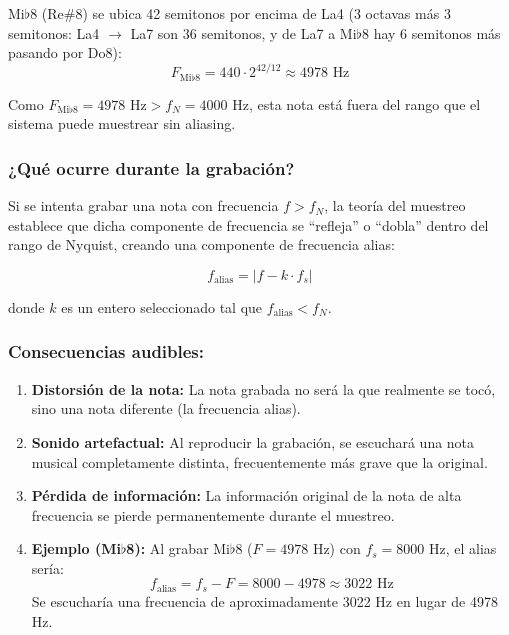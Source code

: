 \documentclass[12pt]{article}
\begin{document}
Mi\(\flat\)8 (Re\#8) se ubica 42 semitonos por encima de La4 (3 octavas más 3 semitonos: La4 $\to$ La7 son 36 semitonos, y de La7 a Mi\(\flat\)8 hay 6 semitonos más pasando por Do8):
\[
F_{\text{Mi}\flat 8} = 440 \cdot 2^{42/12} \approx 4978 \text{ Hz}
\]

Como \(F_{\text{Mi}\flat 8} = 4978 \text{ Hz} > f_N = 4000 \text{ Hz}\), esta nota está fuera del rango que el sistema puede muestrear sin aliasing.

\subsubsection*{¿Qué ocurre durante la grabación?}
 
Si se intenta grabar una nota con frecuencia \(f > f_N\), la teoría del muestreo establece que dicha componente de frecuencia se ``refleja'' o ``dobla'' dentro del rango de Nyquist, creando una componente de frecuencia alias:
 
\[
f_{\text{alias}} = |f - k \cdot f_s|
\]
 
donde \(k\) es un entero seleccionado tal que \(f_{\text{alias}} < f_N\).
 
\subsubsection*{Consecuencias audibles:}
 
\begin{enumerate}
    \item \textbf{Distorsión de la nota:} La nota grabada no será la que realmente se tocó, sino una nota diferente (la frecuencia alias).
    
    \item \textbf{Sonido artefactual:} Al reproducir la grabación, se escuchará una nota musical completamente distinta, frecuentemente más grave que la original.
    
    \item \textbf{Pérdida de información:} La información original de la nota de alta frecuencia se pierde permanentemente durante el muestreo.
    
    \item \textbf{Ejemplo (Mi\(\flat\)8):} Al grabar Mi\(\flat\)8 (\(F = 4978 \text{ Hz}\)) con \(f_s = 8000 \text{ Hz}\), el alias sería:
    \[
    f_{\text{alias}} = f_s - F = 8000 - 4978 \approx 3022 \text{ Hz}
    \]
    Se escucharía una frecuencia de aproximadamente 3022 Hz en lugar de 4978 Hz.
\end{enumerate}
\end{document}
